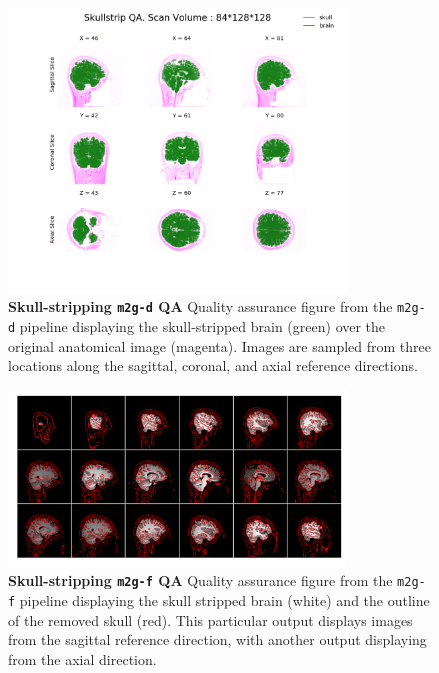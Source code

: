 \begin{figure}[h!]
    \centering
    \includegraphics[width = 0.8\textwidth]{figures/m2g/diff_skullstip.png}
    \caption[Quality assurance figure from the \texttt{m2g-d} pipeline]{\textbf{Skull-stripping \texttt{m2g-d} QA} Quality assurance figure from the \texttt{m2g-d} pipeline displaying the skull-stripped brain (green) over the original anatomical image (magenta). Images are sampled from three locations along the sagittal, coronal, and axial reference directions.
    }
    \label{fig:diff_skull}
\end{figure}

\begin{figure}[h!]
    \centering
    \includegraphics[width = 0.8\textwidth]{figures/m2g/func_skullstrip.png}
    \caption[Quality assurance figure from the \texttt{m2g-f} pipeline]{\textbf{Skull-stripping \texttt{m2g-f} QA} Quality assurance figure from the \texttt{m2g-f} pipeline displaying the skull stripped brain (white) and the outline of the removed skull (red). This particular output displays images from the sagittal reference direction, with another output displaying from the axial direction.
    }
    \label{fig:func_skull}
\end{figure}

